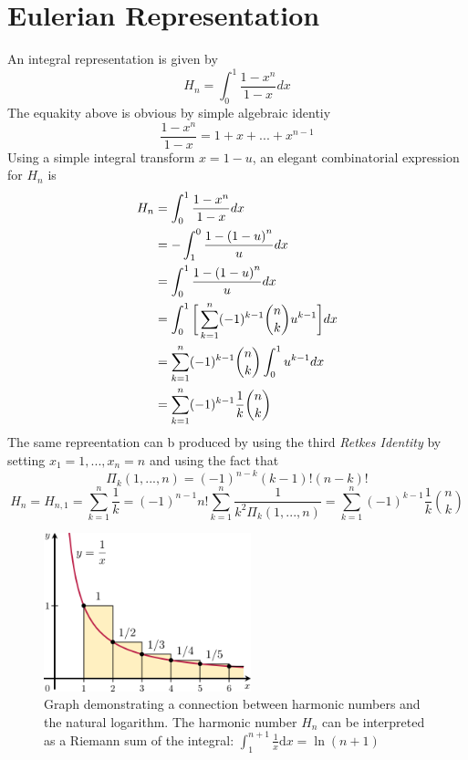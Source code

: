 \documentclass[2pt]{article}
\begin{document}
\section{Eulerian Representation}
An integral representation is given by
\begin{equation}
H_{n} = \int_{0}^{1} \frac{1-x^n}{1-x} dx \label{Euler equation}
\end{equation}
The equakity above is obvious by simple algebraic identiy
\begin{equation}
\frac{1-x^n}{1-x} = 1+x+...+x^{n-1}
\end{equation}
Using a simple integral transform ${x = 1-u}$, an elegant combinatorial expression for $H_{n}$ is
\begin{align}
H_{n} &= \int_{0}^{1} \frac{1-x^n}{1-x} dx \\
	 &= -\int_{1}^{0} \frac{1-{(1-u)}^n}{u} dx \\
	 &= \int_{0}^{1} \frac{1-{(1-u)}^n}{u} dx \\
	 &= \int_{0}^{1} \bigg{[}\sum_{k=1}^{n} (-1)^{k-1} {n \choose k} u^{k-1}\bigg{]}dx \\
	 &= \sum_{k=1}^{n} (-1)^{k-1} {n \choose k} \int_{0}^{1} u^{k-1} dx\\
	 &= \sum_{k=1}^{n} (-1)^{k-1} \frac{1}{k} {n \choose k}
\end{align}
The same repreentation can b produced by using the third \emph{Retkes Identity} by setting $x_{1} = 1, . . . , x_{n} = n$ and using the fact that
\begin{equation}
{\Pi}_{k}(1, . . . , n) = {(-1)}^{n-k} (k-1)!(n-k)!
\end{equation}
\begin{equation}
H_{n}=H_{n,1}=\sum_{k=1}^{n} \frac{1}{k} = {(-1)}^{n-1}n!\sum_{k=1}^{n}\frac{1}{k^{2}{\Pi}_{k}(1, . . . ,n)}=\sum_{k=1}^{n}{(-1)}^{k-1}\frac{1}{k}{n \choose k}
\end{equation}
\begin{figure}
\includegraphics[width=6cm]{2.png}
\caption{\small{Graph demonstrating a connection between harmonic numbers and the natural logarithm. The harmonic number $H_{n}$ can be interpreted as a Riemann sum of the integral: $\int_1^{n+1} \frac{1}{x} \mathrm{d}x = \ln(n+1)$}}
\end{figure}
\end{document}
